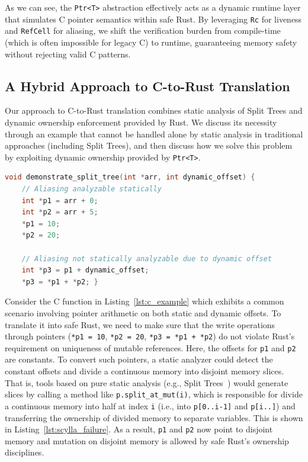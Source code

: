 \documentclass{llncs} %
\begin{document}

As we can see, the \texttt{Ptr<T>} abstraction effectively acts as a dynamic runtime layer that simulates C pointer semantics within safe Rust. By leveraging \texttt{Rc} for liveness and \texttt{RefCell} for aliasing, we shift the verification burden from compile-time (which is often impossible for legacy C) to runtime, guaranteeing memory safety without rejecting valid C patterns. %

\subsection{A Hybrid Approach to C-to-Rust Translation}

Our approach to C-to-Rust translation combines static analysis of Split Trees and dynamic ownership enforcement provided by Rust. We discuss its necessity through an example that cannot be handled alone by static analysis in traditional approaches (including Split Trees), and then discuss how we solve this problem by exploiting dynamic ownership provided by \texttt{Ptr<T>}.

\begin{lstlisting}[style=mystyle, language=C, caption={A C function with a dynamic pointer offset}, label={lst:c_example}]
void demonstrate_split_tree(int *arr, int dynamic_offset) {
    // Aliasing analyzable statically 
    int *p1 = arr + 0;
    int *p2 = arr + 5;
    *p1 = 10;
    *p2 = 20;

    // Aliasing not statically analyzable due to dynamic offset
    int *p3 = p1 + dynamic_offset;
    *p3 = *p1 + *p2; }
\end{lstlisting}

Consider the C function in Listing~\ref{lst:c_example} which exhibits a common scenario involving pointer arithmetic on both static and dynamic offsets. To translate it into safe Rust, we need to make sure that the write operations through pointers (\texttt{*p1 = 10}, \texttt{*p2 = 20}, \texttt{*p3 = *p1 + *p2}) do not violate Rust's requirement on uniqueness of mutable references.
%
Here, the offsets for \texttt{p1} and \texttt{p2} are constants. To convert such pointers, a static analyzer could detect the constant offsets and divide a continuous memory into disjoint memory slices. That is, tools based on pure static analysis (e.g., Split Trees~\cite{Fromherz2024}) would generate slices by calling a method like \texttt{p.split\_at\_mut(i)}, which is responsible for divide a continuous memory into half at index \texttt{i} (i.e., into \texttt{p[0..i-1]} and \texttt{p[i..]}) and transferring the ownership of divided memory to separate variables. This is shown in Listing~\ref{lst:scylla_failure}. As a result, \texttt{p1} and \texttt{p2} now point to disjoint memory and mutation on disjoint memory is allowed by safe Rust's ownership disciplines.
\end{document}
